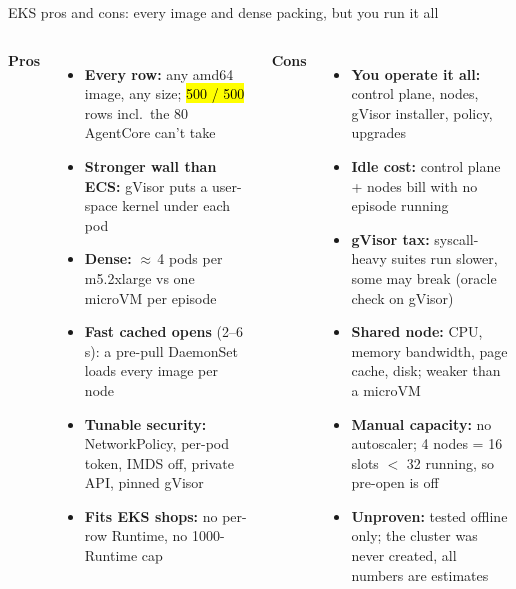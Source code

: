 \begin{frame}{EKS pros and cons: every image and dense packing, but you run it all}
\begin{columns}[T]
{\small\bfseries\color{awsteal}Pros\par}\vspace{1mm}
\begin{itemize}\scriptsize\setlength{\itemsep}{1.2mm}
\item[\yes] \textbf{Every row:} any amd64 image, any size; \hl{500 / 500} rows incl.\ the 80 AgentCore can't take
\item[\yes] \textbf{Stronger wall than ECS:} gVisor puts a user-space kernel under each pod
\item[\yes] \textbf{Dense:} $\approx$\,4 pods per m5.2xlarge vs one microVM per episode
\item[\yes] \textbf{Fast cached opens} (2--6\,s\est): a pre-pull DaemonSet loads every image per node
\item[\yes] \textbf{Tunable security:} NetworkPolicy, per-pod token, IMDS off, private API, pinned gVisor
\item[\yes] \textbf{Fits EKS shops:} no per-row Runtime, no 1000-Runtime cap
\end{itemize}
{\small\bfseries\color{awsmagenta}Cons\par}\vspace{1mm}
\begin{itemize}\scriptsize\setlength{\itemsep}{1.2mm}
\item[\no] \textbf{You operate it all:} control plane, nodes, gVisor installer, policy, upgrades
\item[\no] \textbf{Idle cost:} control plane + nodes bill with no episode running
\item[\no] \textbf{gVisor tax:} syscall-heavy suites run slower, some may break (oracle check on gVisor)
\item[\no] \textbf{Shared node:} CPU, memory bandwidth, page cache, disk; weaker than a microVM
\item[\no] \textbf{Manual capacity:} no autoscaler; 4 nodes = 16 slots $<$ 32 running, so pre-open is off
\item[\no] \textbf{Unproven:} tested offline only; the cluster was never created, all numbers are estimates
\end{itemize}
\end{columns}
\par\vspace{2mm}
\end{frame}

